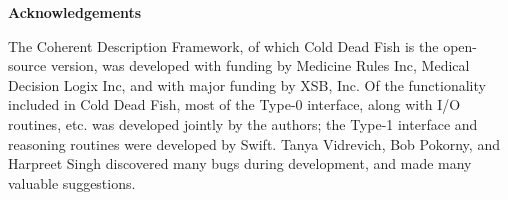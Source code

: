 

\begin{center}
{\Large {\bf Acknowledgements } }
\end{center}

The Coherent Description Framework, of which Cold Dead Fish is the
open-source version, was developed with funding by Medicine Rules Inc,
Medical Decision Logix Inc, and with major funding by XSB, Inc.  Of
the functionality included in Cold Dead Fish, most of the Type-0
interface, along with I/O routines, etc. was developed jointly by the
authors; the Type-1 interface and reasoning routines were developed by
Swift.  Tanya Vidrevich, Bob Pokorny, and Harpreet Singh discovered
many bugs during development, and made many valuable suggestions.
